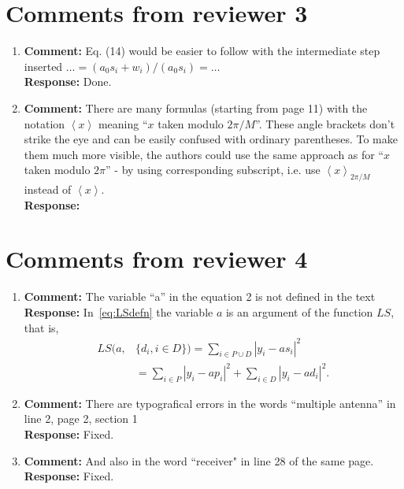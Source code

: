 \documentclass{article}
\newcommand{\fracpart}[1]{\left\langle #1 \right\rangle}
\newcommand{\abs}[1]{{\left\vert #1 \right\vert}}
\begin{document}
\section{Comments from reviewer 3}

\begin{enumerate}

\item \textbf{Comment:}  Eq. (14) would be easier to follow with the intermediate step inserted $\dots = (a_0s_i + w_i)/(a_0s_i) = \dots$ \\
\textbf{Response:} Done.

\item \textbf{Comment:}  There are many formulas (starting from page 11) with the notation $\fracpart{x}$ meaning ``$x$ taken modulo $2\pi/M$''. These angle brackets don't strike the eye and can be easily confused with ordinary parentheses. To make them much more visible, the authors could use the same approach as for ``$x$ taken modulo $2\pi$'' - by using corresponding subscript, i.e. use $\fracpart{x}_{2\pi/M}$ instead of $\fracpart{x}$. \\
\textbf{Response:}

 \end{enumerate}

\section{Comments from reviewer 4}

\begin{enumerate}

\item \textbf{Comment:}  The variable  ``a'' in the equation 2 is not defined in the text \\
\textbf{Response:} In~\eqref{eq:LSdefn} the variable $a$ is an argument of the function $LS$, that is,
\[
\begin{split}
LS(a, &\{d_i, i \in D\}) = \sum_{i \in P \cup D} \abs{ y_i - a s_i }^2  \\
&= \sum_{i \in P} \abs{ y_i - a p_i }^2 + \sum_{i \in D} \abs{ y_i - a d_i }^2.
\end{split}
\]

\item \textbf{Comment:}  There are typografical errors in the words  ``multiple antenna'' in line 2, page 2, section 1 \\
\textbf{Response:} Fixed.

\item \textbf{Comment:}  And also in the word ``receiver" in line 28 of the same page.
 \\
\textbf{Response:} Fixed.


\end{enumerate}


\end{document}
